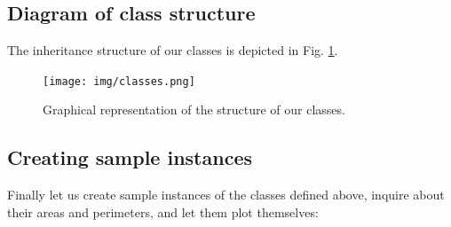 \documentclass[article,A4,12pt]{llncs}
\begin{document}
\noindent

\subsection{Diagram of class structure}

The inheritance structure of our classes is depicted in Fig. \ref{fig:classes}.

\begin{figure}[!ht]
\begin{center}
\texttt{[image: img/classes.png]}
\end{center}
\vspace{-2mm}
\caption{Graphical representation of the structure of our classes.}
\label{fig:classes}
\end{figure}

\subsection{Creating sample instances}

Finally let us create sample instances of the classes defined above, inquire
about their areas and perimeters, and let them plot themselves:\\
\end{document}
